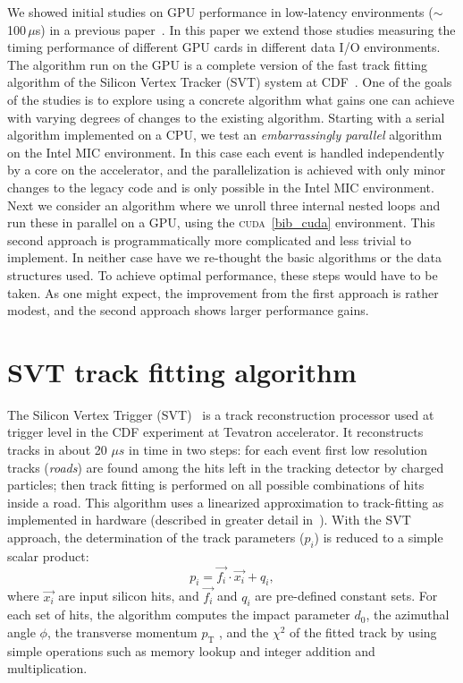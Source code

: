 \documentclass[letterpaper]{jpconf}
\begin{document}
We showed initial studies on GPU performance in low-latency
environments ($\sim$100\,$\mu$s) in a previous paper~\cite{TIPP2011,NSS2012}.  In this paper we extend those studies measuring the
timing performance of different GPU cards in different data I/O
environments. The algorithm run on the GPU is a complete version of
the fast track fitting algorithm of the Silicon Vertex Tracker (SVT)
system at CDF~\cite{SVT1}. 
One of the goals of the studies is to explore using a concrete
algorithm what gains one can achieve with varying degrees of changes
to the existing algorithm. Starting with a serial algorithm
implemented on a CPU, we test an \textit{embarrassingly parallel} algorithm
on the Intel MIC environment. In this case each event is handled
independently by a core on the accelerator, and the parallelization is
achieved with only minor changes to the legacy code and is only
possible in the Intel MIC environment. Next we consider an algorithm
where we unroll three internal nested loops and run these in parallel
on a GPU, using the \textsc{cuda}~\ref{bib_cuda} environment. This second 
approach is programmatically more complicated and less trivial to implement. In
neither case have we re-thought the basic algorithms or the data
structures used. To achieve optimal performance, these steps would
have to be taken.  As one might expect, the improvement from the first
approach is rather modest, and the second approach shows larger
performance gains.

\section{SVT track fitting algorithm}
The Silicon Vertex Trigger (SVT)~\cite{SVT1,SVT2} is a 
track reconstruction processor used at 
trigger level in the CDF experiment at Tevatron accelerator. It reconstructs 
tracks in about 20 $\mu s$ in time in two steps: for each event 
first low resolution tracks (\textit{roads}) are found among the hits left 
in the tracking detector by charged particles; then track fitting is 
performed on all possible combinations of hits inside a road. 
This algorithm uses a linearized approximation to track-fitting as 
implemented in hardware (described in greater detail in~\cite{SVT3}). 
With the SVT approach, the determination of the track parameters 
($p_i$) is reduced to a simple scalar product:
\[
p_i = \vec{f_i} \cdot \vec{x_i} + q_i,
\]
where $\vec{x_i}$ are input silicon hits, and $\vec{f_i}$ and $q_i$ are 
pre-defined constant sets. For each set of hits, the algorithm
computes the impact parameter $d_0$, the azimuthal angle $\phi$, 
the transverse momentum $p_\mathrm{T}$ , and the $\chi^2$ of the
fitted track by using simple operations such as memory lookup and 
integer addition and multiplication.
\end{document}
